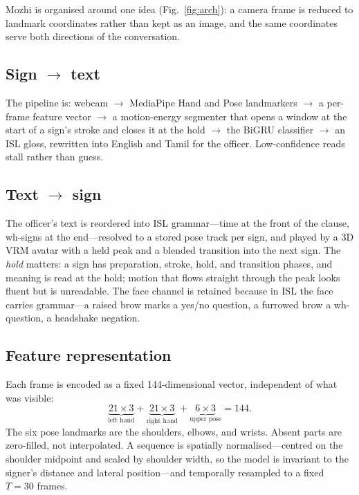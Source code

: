 \documentclass[conference]{IEEEtran}
\begin{document}
Mozhi is organised around one idea (Fig.~\ref{fig:arch}): a camera frame is
reduced to landmark coordinates rather than kept as an image, and the same
coordinates serve both directions of the conversation.

\subsection{Sign $\rightarrow$ text}
The pipeline is: webcam $\rightarrow$ MediaPipe Hand and Pose
landmarkers $\rightarrow$ a per-frame feature vector $\rightarrow$ a
motion-energy segmenter that opens a window at the start of a sign's stroke and
closes it at the hold $\rightarrow$ the BiGRU classifier $\rightarrow$ an ISL
gloss, rewritten into English and Tamil for the officer. Low-confidence reads
stall rather than guess.

\subsection{Text $\rightarrow$ sign}
The officer's text is reordered into ISL grammar---time at the front of the
clause, wh-signs at the end---resolved to a stored pose track per sign, and
played by a 3D VRM avatar with a held peak and a blended transition into the
next sign. The \emph{hold} matters: a sign has preparation, stroke, hold, and
transition phases, and meaning is read at the hold; motion that flows straight
through the peak looks fluent but is unreadable. The face channel is retained
because in ISL the face carries grammar---a raised brow marks a yes/no question,
a furrowed brow a wh-question, a headshake negation.

\subsection{Feature representation}
Each frame is encoded as a fixed 144-dimensional vector, independent of what was
visible:
\begin{equation}
\underbrace{21{\times}3}_{\text{left hand}} + \underbrace{21{\times}3}_{\text{right hand}} + \underbrace{6{\times}3}_{\text{upper pose}} = 144 .
\end{equation}
The six pose landmarks are the shoulders, elbows, and wrists. Absent parts are
zero-filled, not interpolated. A sequence is spatially normalised---centred on
the shoulder midpoint and scaled by shoulder width, so the model is invariant to
the signer's distance and lateral position---and temporally resampled to a fixed
$T=30$ frames.
\end{document}
